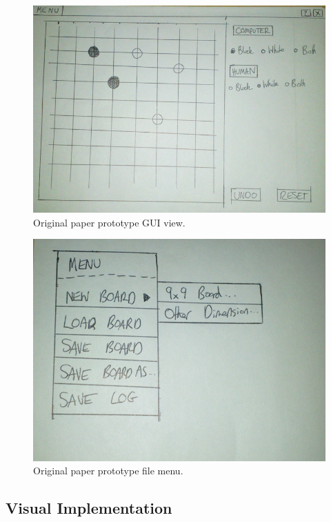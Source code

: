 \documentclass{l3proj}
\begin{document}
\begin{figure}[H]
\centering
\includegraphics[scale=0.4]{Images/GUI-1-PP.png}
\caption{Original paper prototype GUI view.}
\end{figure}

\begin{figure}[H]
\centering
\includegraphics[scale=0.4]{Images/GUI-2-PP.png}
\caption{Original paper prototype file menu.}
\end{figure}

\subsection{Visual Implementation}
\end{document}
